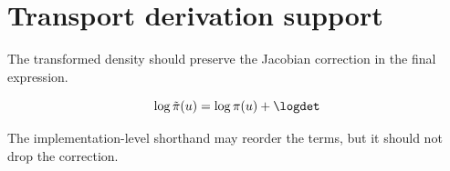 \section{Transport derivation support}
The transformed density should preserve the Jacobian correction in the final expression.

\begin{equation}\label{eq:transport-density-step}
\log \tilde{\pi}(u) = \log \pi(u) + \logdet
\end{equation}

The implementation-level shorthand may reorder the terms, but it should not drop the correction.
